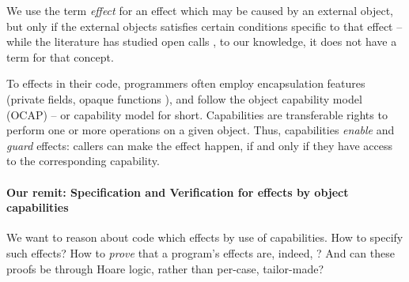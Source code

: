 We  use the term \emph{\tamed  effect} for   an effect which may be caused by an external object, but only if the external objects satisfies certain conditions specific to that effect -- 
while the literature has studied open calls \cite{Lars},  to our knowledge, it does not have a term for that concept. %
%
%
 
To \tame  effects in their code, programmers often  employ encapsulation features 
 (\eg private fields, opaque functions \etc \cite{xxx}), and  follow the object capability model (OCAP)\cite{Miller} --
 or capability model for short. 
Capabilities are transferable rights to perform one or more operations on a given object.
Thus, capabilities \emph{enable} and  \emph{guard} effects:   
 callers can make the effect   happen, if and only if they have access to the corresponding capability.
 
 
\paragraph{Our remit: Specification and Verification  for  effects \tamed by object capabilities}  
We want to reason about  code which \tames effects by use of capabilities.
How  to specify such \tamed effects? How to \emph{prove} that a program's effects are, indeed, \tamed?
And can these proofs be  through Hoare logic, rather than   per-case, tailor-made?
 
